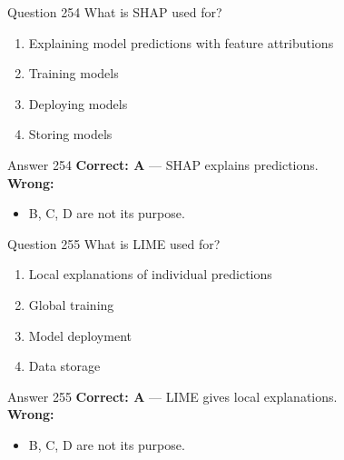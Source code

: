 \documentclass[aspectratio=169,11pt]{beamer}
\begin{document}
	\begin{frame}{Question 254}
		What is SHAP used for?
		\begin{enumerate}[label=\Alph*.]
			\item Explaining model predictions with feature attributions
			\item Training models
			\item Deploying models
			\item Storing models
		\end{enumerate}
	\end{frame}
	\begin{frame}{Answer 254}
		\textbf{Correct: A} --- SHAP explains predictions.\\
		\vspace{0.5em}
		\textbf{Wrong:}
		\begin{itemize}
			\item B, C, D are not its purpose.
		\end{itemize}
	\end{frame}
	
	\begin{frame}{Question 255}
		What is LIME used for?
		\begin{enumerate}[label=\Alph*.]
			\item Local explanations of individual predictions
			\item Global training
			\item Model deployment
			\item Data storage
		\end{enumerate}
	\end{frame}
	\begin{frame}{Answer 255}
		\textbf{Correct: A} --- LIME gives local explanations.\\
		\vspace{0.5em}
		\textbf{Wrong:}
		\begin{itemize}
			\item B, C, D are not its purpose.
		\end{itemize}
	\end{frame}
	
\end{document}
